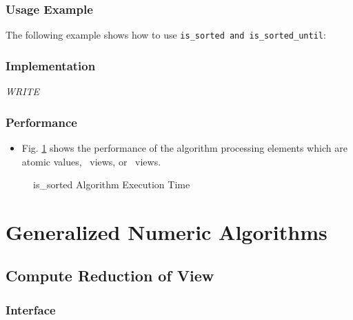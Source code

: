\subsubsection{Usage Example} %

The following example shows how to use \texttt{is\_sorted and is\_sorted\_until}:

 
\subsubsection{Implementation} %

\textit{WRITE}

\subsubsection{Performance} %

\begin{itemize}
\item
Fig. \ref{fig:is-sort-alg-exec-exper}
shows the performance of the algorithm processing
elements which are atomic values, \stl\ views, or \stapl\ views.
\end{itemize}

\begin{figure}[p]
\caption{is\_sorted Algorithm Execution Time}
\label{fig:is-sort-alg-exec-exper}
\end{figure}


\section{Generalized Numeric Algorithms} \label{sec-numer-alg}

\subsection{Compute Reduction of View} \label{sec-num-reduce}

\subsubsection{Interface} %

